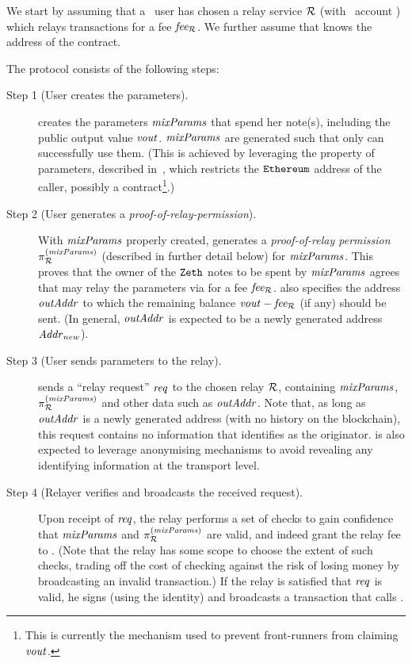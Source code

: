 We start by assuming that a \zeth~user \userZethAccount{} has chosen a relay service $\mathcal{R}$ (with \ethereum~account \relayEthAccount{}) which relays transactions for a fee $\mathit{fee_{\mathcal{R}}}$. We further assume that \userZethAccount{} knows the address of the \relayexec{} contract.

The protocol consists of the following steps:

\begin{description}
  \item[Step 1 (User creates the \mix{} parameters).] \userZethAccount{} creates the \mix{} parameters $\mathit{mixParams}$ that spend her note(s), including the public output value $\mathit{vout}$. $\mathit{mixParams}$ are generated such that only \relayexec{} can successfully use them. (This is achieved by leveraging the property of \mix{} parameters, described in~\cite[Sections 2.4, 2.5]{zeth-protocol}, which restricts the $\texttt{Ethereum}$ address of the caller, possibly a contract\footnote{This is currently the mechanism used to prevent front-runners from claiming $\mathit{vout}$.}.)

  \item[Step 2 (User generates a \emph{proof-of-relay-permission}).] With $\mathit{mixParams}$ properly created, \userZethAccount{} generates a \emph{proof-of-relay permission} $\pi^{(\mathit{mixParams})}_{\mathcal{R}}$ (described in further detail below) for $\mathit{mixParams}$. This proves that the owner of the $\texttt{Zeth}$ notes to be spent by $\mathit{mixParams}$ agrees that \relayEthAccount{} may relay the \mix{} parameters via \relayexec{} for a fee $\mathit{fee_{\mathcal{R}}}$. \userZethAccount{} also specifies the address $\mathit{outAddr}$ to which the remaining balance $\mathit{vout} - \mathit{fee_{\mathcal{R}}}$ (if any) should be sent. (In general, $\mathit{outAddr}$ is expected to be a newly generated address $\mathit{Addr}_{new}$).

  \item[Step 3 (User sends parameters to the relay).] \userZethAccount{} sends a ``relay request'' $\mathit{req}$ to the chosen relay $\mathcal{R}{}$, containing $\mathit{mixParams}$, $\pi^{(\mathit{mixParams})}_{\mathcal{R}}$ and other data such as $\mathit{outAddr}$. Note that, as long as $\mathit{outAddr}$ is a newly generated address (with no history on the blockchain), this request contains no information that identifies \userZethAccount{} as the originator. \userZethAccount{} is also expected to leverage anonymising mechanisms to avoid revealing any identifying information at the transport level.

  \item[Step 4 (Relayer verifies and broadcasts the received request).] Upon receipt of $\mathit{req}$, the relay performs a set of checks to gain confidence that $\mathit{mixParams}$ and $\pi^{(\mathit{mixParams})}_{\mathcal{R}}$ are valid, and indeed grant the relay fee to \relayEthAccount{}. (Note that the relay has some scope to choose the extent of such checks, trading off the cost of checking against the risk of losing money by broadcasting an invalid transaction.) If the relay is satisfied that $\mathit{req}$ is valid, he signs (using the \relayEthAccount{} identity) and broadcasts a transaction that calls \relayexec{}.


\end{description}
